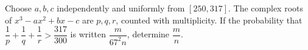 Choose $a,b,c$ independently and uniformly from $[250,317]$. The complex roots of $x^3-ax^2+bx-c$ are $p,q,r$, counted with multiplicity. If the probability that $\dfrac{1}{p}+\dfrac{1}{q}+\dfrac{1}{r}>\dfrac{317}{300}$ is written $\dfrac{m}{67^2 n}$, determine $\dfrac{m}{n}$.
